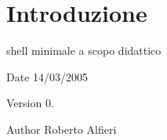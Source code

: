 \section{Introduzione}\label{index_intro}
shell minimale a scopo didattico

\begin{DoxyDate}{Date}
14/03/2005 
\end{DoxyDate}
\begin{DoxyVersion}{Version}
0. 
\end{DoxyVersion}
\begin{DoxyAuthor}{Author}
Roberto Alfieri 
\end{DoxyAuthor}
